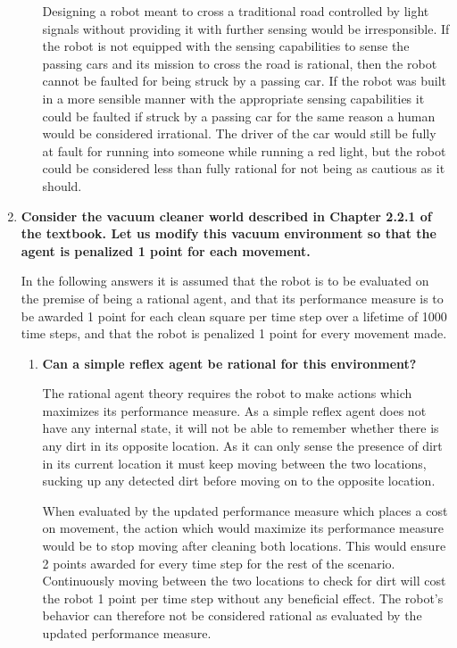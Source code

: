 \begin{enumerate}
\begin{enumerate}
Designing a robot meant to cross a traditional road controlled by light signals without providing it with further sensing would be irresponsible. If the robot is not equipped with the sensing capabilities to sense the passing cars and its mission to cross the road is rational, then the robot cannot be faulted for being struck by a passing car. If the robot was built in a more sensible manner with the appropriate sensing capabilities it could be faulted if struck by a passing car for the same reason a human would be considered irrational. The driver of the car would still be fully at fault for running into someone while running a red light, but the robot could be considered less than fully rational for not being as cautious as it should.

\end{enumerate}

\item \textbf{Consider the vacuum cleaner world described in Chapter 2.2.1 of the textbook. Let us modify this vacuum environment so that the agent is penalized 1 point for each movement.}

In the following answers it is assumed that the robot is to be evaluated on the premise of being a rational agent, and that its performance measure is to be awarded 1 point for each clean square per time step over a lifetime of 1000 time steps, and that the robot is penalized 1 point for every movement made.

\begin{enumerate}

\item \textbf{Can a simple reflex agent be rational for this environment?} 

The rational agent theory requires the robot to make actions which maximizes its performance measure. As a simple reflex agent does not have any internal state, it will not be able to remember whether there is any dirt in its opposite location. As it can only sense the presence of dirt in its current location it must keep moving between the two locations, sucking up any detected dirt before moving on to the opposite location. 

When evaluated by the updated performance measure which places a cost on movement, the action which would maximize its performance measure would be to stop moving after cleaning both locations. This would ensure 2 points awarded for every time step for the rest of the scenario. Continuously moving between the two locations to check for dirt will cost the robot 1 point per time step without any beneficial effect. The robot's behavior can therefore not be considered rational as evaluated by the updated performance measure. 


\end{enumerate}
\end{enumerate}
